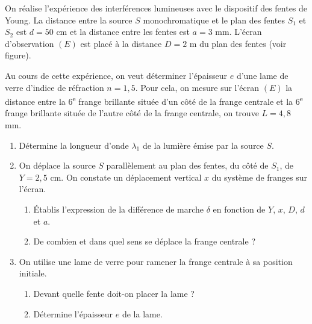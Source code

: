 \documentclass[11pt]{article}
\begin{document}
On réalise l'expérience des interférences lumineuses avec le dispositif des fentes de Young. La distance entre la source $S$ monochromatique et le plan des fentes $S_1$ et $S_2$ est $d = 50$ cm et la distance entre les fentes est $a = 3$ mm. L'écran d'observation $(E)$ est placé à la distance $D = 2$ m du plan des fentes (voir figure).

\begin{center}
\end{center}

\noindent Au cours de cette expérience, on veut déterminer l'épaisseur $e$ d'une lame de verre d'indice de réfraction $n = 1{,}5$. Pour cela, on mesure sur l'écran $(E)$ la distance entre la 6\textsuperscript{e} frange brillante située d'un côté de la frange centrale et la 6\textsuperscript{e} frange brillante située de l'autre côté de la frange centrale, on trouve $L = 4{,}8$ mm.

\begin{enumerate}
  \item Détermine la longueur d'onde $\lambda_1$ de la lumière émise par la source $S$.
  \item On déplace la source $S$ parallèlement au plan des fentes, du côté de $S_1$, de $Y = 2{,}5$ cm. On constate un déplacement vertical $x$ du système de franges sur l'écran.
  \begin{enumerate}[label=\alph*.]
    \item Établis l'expression de la différence de marche $\delta$ en fonction de $Y$, $x$, $D$, $d$ et $a$.
    \item De combien et dans quel sens se déplace la frange centrale ?
  \end{enumerate}
  \item On utilise une lame de verre pour ramener la frange centrale à sa position initiale.
  \begin{enumerate}[label=\alph*.]
    \item Devant quelle fente doit-on placer la lame ?
    \item Détermine l'épaisseur $e$ de la lame.
  \end{enumerate}
\end{enumerate}
\end{document}
